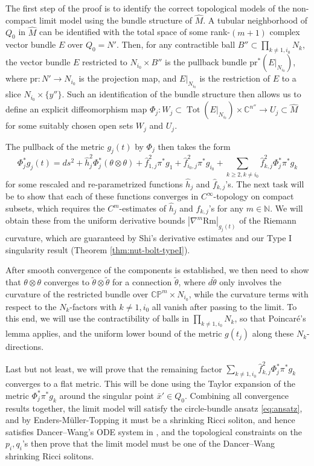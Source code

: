 \documentclass[11pt]{amsart}
\theoremstyle{plain}
\numberwithin{equation}{section}
\theoremstyle{definition}
\theoremstyle{remark}
\begin{document}
The first step of the proof is to identify the correct topological models of the non-compact limit model using the bundle structure of $\widehat{M}$. A tubular neighborhood of $Q_0$ in $\widehat{M}$ can be identified with the total space of some rank-$(m+1)$ complex vector bundle $E$ over $Q_0 = N'$. Then, for any contractible ball $B'' \subset \prod_{k \not= 1,i_0} N_k$, the vector bundle $E$ restricted to $N_{i_0} \times B''$ is the pullback bundle $\textrm{pr}^*(E|_{N_{i_0}})$, where $\textrm{pr} : N' \to N_{i_0}$ is the projection map, and $E|_{N_{i_0}}$ is the restriction of $E$ to a slice $N_{i_0} \times \{y''\}$. Such an identification of the bundle structure then allows us to define an explicit diffeomorphism map $\Phi_j : W_j \subset \operatorname{Tot}(E|_{N_{i_0}}) \times \mathbb{C}^{n''} \to U_j \subset \widehat{M}$ for some suitably chosen open sets $W_j$ and $U_j$.

The pullback of the metric $g_j(t)$ by $\Phi_j$ then takes the form
\[\Phi_j^*g_j(t) = ds^2 + \hat{h}_j^2 \Phi_j^*(\theta\otimes\theta) + \hat{f}_{1,j}^2 \pi^*g_1 + \hat{f}_{i_0,j}^2 \pi^*g_{i_0} + \sum_{k\geq 2, k\not= i_0}\hat{f}_{k,j}^2 \Phi_j^*\pi^*g_k\]
for some rescaled and re-parametrized functions $\hat{h}_j$ and $\hat{f}_{k,j}$'s. The next task will be to show that each of these functions converges in $C^\infty$-topology on compact subsets, which requires the $C^m$-estimates of $\hat{h}_j$ and $\hat{f}_{k,j}$'s for any $m \in \mathbb{N}$. We will obtain these from the uniform derivative bounds $|\nabla^m \textrm{Rm}|_{g_j(t)}$ of the Riemann curvature, which are guaranteed by Shi's derivative estimates \cite{Shi} and our Type I singularity result (Theorem \ref{thm:nut-bolt-typeI}).

After smooth convergence of the components is established, we then need to show that $\theta \otimes \theta$ converges to $\widetilde{\theta} \otimes \widetilde{\theta}$ for a connection $\widetilde{\theta}$, where $d\widetilde{\theta}$ only involves the curvature of the restricted bundle over $\mathbb{CP}^m \times N_{i_0}$, while the curvature terms with respect to the $N_k$-factors with $k \not= 1, i_0$ all vanish after passing to the limit. To this end, we will use the contractibility of balls in $\prod_{k \not= 1,i_0} N_k$, so that Poincar\'e's lemma applies, and the uniform lower bound of the metric $g(t_j)$ along these $N_k$-directions.

Last but not least, we will prove that the remaining factor $\sum_{k\not= 1,i_0}\hat{f}_{k,j}^2 \Phi_j^*\pi^*g_k$ converges to a flat metric. This will be done using the Taylor expansion of the metric $\Phi_j^*\pi^*g_k$ around the singular point $\bar{x}' \in Q_0$. Combining all convergence results together, the limit model will satisfy the circle-bundle ansatz \eqref{eq:ansatz}, and by Enders-M\"uller-Topping \cite{EMT} it must be a shrinking Ricci soliton, and hence satisfies Dancer--Wang's ODE system in \cite{DW2011}, and the topological constraints on the $p_i, q_i$'s then prove that the limit model must be one of the Dancer--Wang shrinking Ricci solitons.
\end{document}
